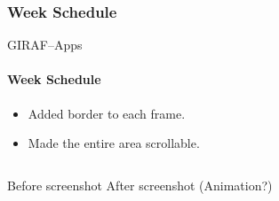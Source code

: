         \subsubsection{Week Schedule}
            \begin{frame}[t]{GIRAF--Apps}\framesubtitle{Week Schedule}
                \begin{itemize}
                    \item Added border to each frame.
                    \item Made the entire area scrollable.
                \end{itemize}
                \bigskip
                \begin{columns}[c]
                        Before screenshot
                        After screenshot (Animation?)
                \end{columns}
            \end{frame}
